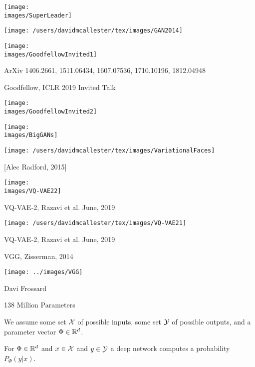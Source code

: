 {\centerline{\texttt{[image: \\images/SuperLeader]}}

\centerline{\texttt{[image: /users/davidmcallester/tex/images/GAN2014]}}


\centerline{\texttt{[image: \\images/GoodfellowInvited1]}}

ArXiv 1406.2661, 1511.06434, 1607.07536, 1710.10196, 1812.04948

\centerline{Goodfellow, ICLR 2019 Invited Talk}


\centerline{\texttt{[image: \\images/GoodfellowInvited2]}}


\centerline{\texttt{[image: \\images/BigGANs]}}


\centerline{\texttt{[image: /users/davidmcallester/tex/images/VariationalFaces]}}
\centerline{[Alec Radford, 2015]}


\centerline{\texttt{[image: \\images/VQ-VAE22]}}

\vfill
VQ-VAE-2, Razavi et al. June, 2019


\centerline{\texttt{[image: /users/davidmcallester/tex/images/VQ-VAE21]}}

\vfill
VQ-VAE-2, Razavi et al. June, 2019

{VGG, Zisserman, 2014}

\centerline{\texttt{[image: ../images/VGG]}}
\centerline{\large Davi Frossard}

\vfill
\centerline{{\color{red} 138 Million Parameters}}


{\color{red} We assume some set ${\cal X}$ of possible inputs, some set ${\cal Y}$ of possible outputs,
and a parameter vector $\Phi \in \mathbb{R}^d$.}

\vfill
For $\Phi \in \mathbb{R}^d$ and $x \in {\cal X}$ and $y \in {\cal Y}$ a deep network computes a probability {\color{red} $P_\Phi(y|x)$}.


}

